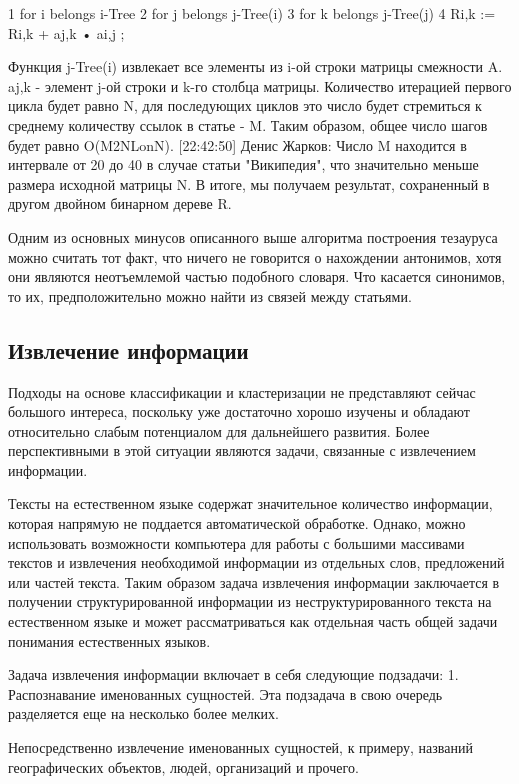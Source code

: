 1 for i belongs i-Tree
2   for j belongs j-Tree(i)
3     for k belongs j-Tree(j)
4       Ri,k := Ri,k + aj,k • ai,j ;


Функция j-Tree(i) извлекает все элементы из i-ой строки матрицы смежности A.
aj,k - элемент j-ой строки и k-го столбца матрицы. Количество итерацией первого
цикла будет равно N, для последующих циклов это число будет стремиться к среднему 
количеству ссылок в статье - M. Таким образом, общее число шагов будет равно O(M2NLonN).
[22:42:50] Денис Жарков: Число M находится в интервале от 20 до 40 в случае статьи "Википедия", 
что значительно меньше размера исходной матрицы N. В итоге, мы получаем результат, 
сохраненный в другом двойном бинарном дереве R.

Одним из основных минусов описанного выше алгоритма построения тезауруса можно считать тот факт,
что ничего не говорится о нахождении антонимов, хотя они являются неотъемлемой частью подобного словаря.
Что касается синонимов, то их, предположительно можно найти из связей между статьями.


\subsection{Извлечение информации}

Подходы на основе классификации и кластеризации не представляют сейчас
большого интереса, поскольку уже достаточно хорошо изучены и обладают
относительно слабым потенциалом для дальнейшего развития. Более
перспективными в этой ситуации являются задачи, связанные с
извлечением информации.

Тексты на естественном языке содержат значительное количество информации,
которая напрямую не поддается автоматической обработке. Однако, можно использовать
возможности компьютера для работы с большими массивами текстов и извлечения
необходимой информации из отдельных слов, предложений или частей текста.
Таким образом задача извлечения информации заключается в получении структурированной
информации из неструктурированного текста на естественном языке и может рассматриваться
как отдельная часть общей задачи понимания естественных языков. 

Задача извлечения информации включает в себя следующие подзадачи:
1. Распознавание именованных сущностей.
   Эта подзадача в свою очередь разделяется еще на несколько более мелких.
   
   Непосредственно извлечение именованных сущностей, к примеру, названий географических
   объектов, людей, организаций и прочего.
   
